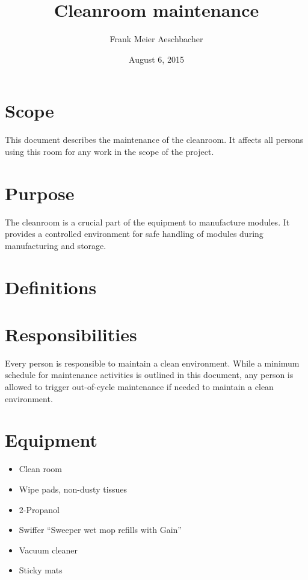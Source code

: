 \documentclass[12pt]{unlsilabsop}
\title{Cleanroom maintenance}
\date{August 6, 2015}
\author{Frank Meier Aeschbacher}
\begin{document}
\maketitle

\section{Scope}
This document describes the maintenance of the cleanroom. It affects all persons using this room for any work in the scope of the project.

\section{Purpose}
The cleanroom is a crucial part of the equipment to manufacture modules. It provides a controlled environment for safe handling of modules during manufacturing and storage.

\section{Definitions}

\section{Responsibilities}
Every person is responsible to maintain a clean environment. While a minimum schedule for maintenance activities is outlined in this document, any person is allowed to trigger out-of-cycle maintenance if needed to maintain a clean environment.

\section{Equipment}

\begin{itemize}
    \item Clean room
    \item Wipe pads, non-dusty tissues
    \item 2-Propanol
    \item Swiffer ``Sweeper wet mop refills with Gain''
    \item Vacuum cleaner
    \item Sticky mats
\end{itemize}
\end{document}
